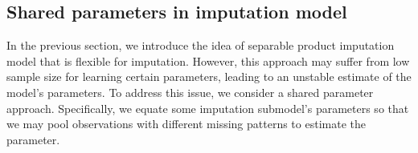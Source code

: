 \documentclass[aos, preprint]{imsart}
\theoremstyle{plain}
\theoremstyle{definition}
\newcommand{\bX}{\mathbf{X}}
\newcommand{\bR}{\mathbf{R}}
\begin{document}
\begin{appendix}
%


\subsection{Shared parameters in imputation model}	\label{sec::pool}

In the previous section, we introduce the idea of separable product imputation model that
is flexible for imputation. 
However, this approach may suffer from low sample size for learning certain parameters,
leading to an unstable estimate of the model's parameters. 
To address this issue, we consider a shared parameter approach. Specifically,
we equate some imputation submodel's parameters so that we may pool observations with different missing patterns
to estimate the parameter.



\end{appendix}
\end{document}
